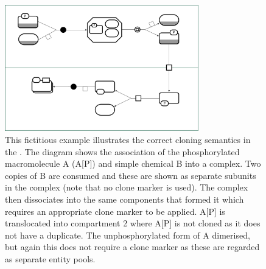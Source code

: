 \begin{figure}[htb]
  \centering
  \includegraphics[width=0.75\textwidth]{images/cloningrules-eg}
  \caption{This fictitious example illustrates the correct cloning semantics in
    the \PDl. The diagram shows the association of the phosphorylated
    macromolecule A (A[P]) and simple chemical B into a complex. Two
    copies of B are consumed and these are shown as separate subunits
    in the complex (note that no clone marker is used). The complex
    then dissociates into the same components that formed it which
    requires an appropriate clone marker to be applied. A[P] is
    translocated into compartment 2 where A[P] is not cloned as it
    does not have a duplicate. The unphosphorylated form of A
    dimerised, but again this does not require a clone marker as these
    are regarded as separate entity pools.}
  \label{fig:techref:cloningrules-eg}
\end{figure}



